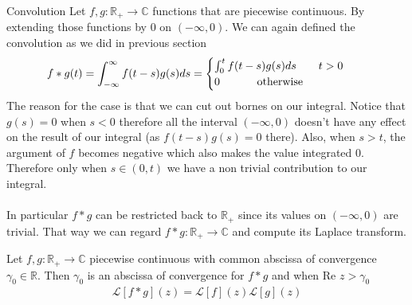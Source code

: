\begin{parag}{Convolution}
    Let $f, g : \mathbb{R}_+ \to \mathbb{C}$ functions that are piecewise continuous. By extending those functions by $0$ on $\left(-\infty, 0\right)$. We can again defined the convolution as we did in previous section 
	\begin{align*} 
		f \ast g\left(t\right) &= \int_{-\infty}^{\infty}f\left(t-s\right)g\left(s\right)ds = \begin{cases}
			\int_{0}^{t}f\left(t-s\right)g\left(s\right)ds \mathspace \mathspace t > 0\\
			0 \mathspace \mathspace \mathspace\text{ otherwise}
		\end{cases}
	\end{align*}
	The reason for the case is that we can cut out bornes on our integral. Notice that $g\left(s\right) = 0$ when $s < 0$ therefore all the interval $\left(-\infty, 0\right)$ doesn't have any effect on the result of our integral (as $f\left(t- s\right)g\left(s\right) = 0$ there). Also, when $s > t$, the argument of $f$ becomes negative which also makes the value integrated $0$. Therefore only when $s \in \left(0, t\right)$ we have a non trivial contribution to our integral.\\
	$ $\\
	In particular $f \ast g$ can be restricted back to $ \mathbb{R}_+$ since its values on $\left(-\infty, 0\right)$ are trivial. That way we can regard $f \ast g : \mathbb{R}_+ \to \mathbb{C}$ and compute its Laplace transform.
\begin{theoreme}
Let $f, g: \mathbb{R}_+ \to \mathbb{C}$ piecewise continuous with common abscissa of convergence $\gamma_0 \in \mathbb{R}$. Then $\gamma_0$ is an abscissa of convergence for $f\ast g$ and when $\text{Re }z > \gamma_0$ 
\begin{align*} 
	\mathcal{L}\left[f \ast g \right]\left(z\right) = \mathcal{L}\left[f\right]\left(z\right) \mathcal{L}\left[g\right]\left(z\right)
\end{align*}
\end{theoreme}
\end{parag}




